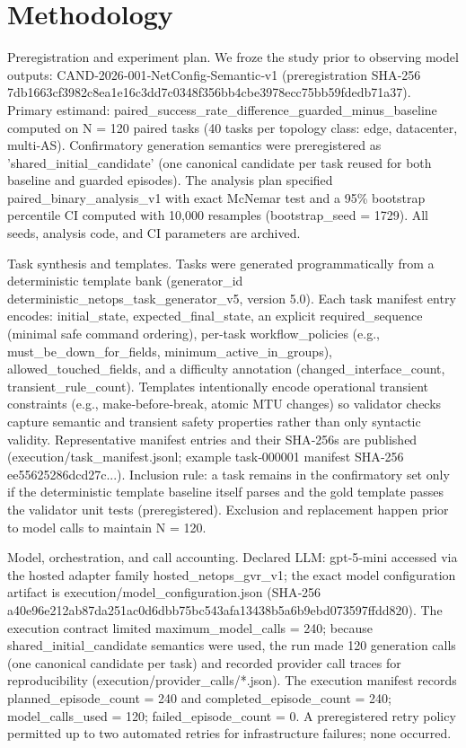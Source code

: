 \documentclass[conference]{IEEEtran}
\begin{document}
\section{Methodology}
Preregistration and experiment plan. We froze the study prior to observing model outputs: CAND‑2026‑001‑NetConfig‑Semantic‑v1 (preregistration SHA‑256 7db1663cf3982c8ea1e16c3dd7c0348f356bb4cbe3978ecc75bb59fdedb71a37). Primary estimand: paired\_success\_rate\_difference\_guarded\_minus\_baseline computed on N = 120 paired tasks (40 tasks per topology class: edge, datacenter, multi‑AS). Confirmatory generation semantics were preregistered as 'shared\_initial\_candidate' (one canonical candidate per task reused for both baseline and guarded episodes). The analysis plan specified paired\_binary\_analysis\_v1 with exact McNemar test and a 95\% bootstrap percentile CI computed with 10,000 resamples (bootstrap\_seed = 1729). All seeds, analysis code, and CI parameters are archived.

Task synthesis and templates. Tasks were generated programmatically from a deterministic template bank (generator\_id deterministic\_netops\_task\_generator\_v5, version 5.0). Each task manifest entry encodes: initial\_state, expected\_final\_state, an explicit required\_sequence (minimal safe command ordering), per‑task workflow\_policies (e.g., must\_be\_down\_for\_fields, minimum\_active\_in\_groups), allowed\_touched\_fields, and a difficulty annotation (changed\_interface\_count, transient\_rule\_count). Templates intentionally encode operational transient constraints (e.g., make‑before‑break, atomic MTU changes) so validator checks capture semantic and transient safety properties rather than only syntactic validity. Representative manifest entries and their SHA‑256s are published (execution/task\_manifest.jsonl; example task‑000001 manifest SHA‑256 ee55625286dcd27c...). Inclusion rule: a task remains in the confirmatory set only if the deterministic template baseline itself parses and the gold template passes the validator unit tests (preregistered). Exclusion and replacement happen prior to model calls to maintain N = 120.

Model, orchestration, and call accounting. Declared LLM: gpt‑5‑mini accessed via the hosted adapter family hosted\_netops\_gvr\_v1; the exact model configuration artifact is execution/model\_configuration.json (SHA‑256 a40e96e212ab87da251ac0d6dbb75bc543afa13438b5a6b9ebd073597ffdd820). The execution contract limited maximum\_model\_calls = 240; because shared\_initial\_candidate semantics were used, the run made 120 generation calls (one canonical candidate per task) and recorded provider call traces for reproducibility (execution/provider\_calls/*.json). The execution manifest records planned\_episode\_count = 240 and completed\_episode\_count = 240; model\_calls\_used = 120; failed\_episode\_count = 0. A preregistered retry policy permitted up to two automated retries for infrastructure failures; none occurred.
\end{document}
